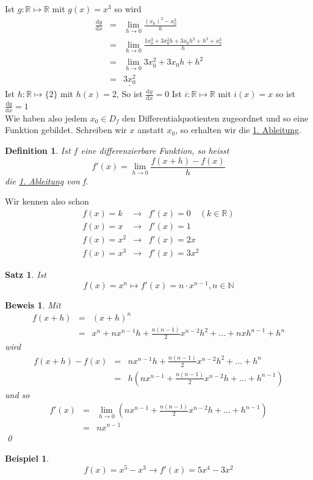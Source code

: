 \documentclass[a4paper,10pt]{report}
\newtheorem{mydef}{Definition}
\newtheorem{myexample}{Beispiel}
\newtheorem{myproof}{Beweis}
\newtheorem{satz}{Satz}
\begin{document}
Ist $ g:\mathbb{R} \mapsto \mathbb{R}$ mit $ g(x) = x^3$ so wird \begin{eqnarray}
\frac{\mathrm{d}y}{\mathrm{d}x} & = & \lim_{h \to 0} \frac{(x_0)^3 - x_0^3}{h} \nonumber \\
& = & \lim_{h \to 0} \frac{1x_0^3 + 3x_0^2h + 3 x_0h^2 + h^3 + x_0^3}{h} \nonumber \\
& = & \lim_{h \to 0} 3x_0^2 + 3x_0h + h^2  \nonumber \\
& = & \underline{3x_0^2} \end{eqnarray}
Ist $ h:\mathbb{R} \mapsto \{2\}$ mit $ h(x) = 2$, %
So ist $ \frac{\mathrm{d}y}{\mathrm{d}x} = 0$
Ist $ i:\mathbb{R} \mapsto \mathbb{R}$ mit $ i(x) = x$ %
so ist $\frac{\mathrm{d}y}{\mathrm{d}x} = 1$\\
Wie haben also jedem $x_0 \in D_f$ den Differentialquotienten zugeordnet und so eine Funktion gebildet. Schreiben wir $x$ anstatt $x_0$, so erhalten wir die \underline{1. Ableitung}.
\begin{mydef} Ist $f$ eine differenzierbare Funktion, so heisst \begin{equation*}f'(x) = \lim_{h \to 0} \frac{f(x+h) -f(x)}{h}\end{equation*}
die \underline{1. Ableitung} von f.\end{mydef}
Wir kennen also schon
\begin{eqnarray}
f(x) = k & \to & f'(x) = 0 \quad  (k \in \mathbb{R}) \\
f(x) = x & \to & f'(x) = 1 \\
f(x) = x^2 & \to & f'(x) = 2x \\
f(x) = x^3 & \to & f'(x) = 3x^2 \end{eqnarray}
\begin{satz}
Ist
\begin{equation*}f(x) = x^n \mapsto f'(x) = n \cdot x^{n-1}, n \in \mathbb{N}\end{equation*}\end{satz}
\begin{myproof}Mit \begin{eqnarray}f(x+h) & = & (x+h)^n \nonumber \\
& = & x^n + nx^{n-1}h + \frac{n(n-1)}{2}x^{n-2}h^2+ ... + nxh^{n-1} + h^n\end{eqnarray}
wird
\begin{eqnarray}f(x+h)-f(x) & = & nx^{n-1}h + \frac{n(n-1)}{2}x^{n-2}h^2+ ... + h^n \nonumber \\
& = & h(nx^{n-1}+\frac{n(n-1)}{2}x^{n-2}h + ... + h^{n-1})\end{eqnarray}
und so
\begin{eqnarray}f'(x) & = & \lim_{h \to 0}(nx^{n-1} + \frac{n(n-1)}{2}x^{n-2}h + ... + h^{n-1}) \nonumber \\
& = & nx^{n-1}\end{eqnarray} \qed
\end{myproof}
\begin{myexample}
\begin{equation*}f(x) = x^5-x^3 \to f'(x) = 5x^4-3x^2\end{equation*}
\end{myexample}
\newpage
\end{document}
